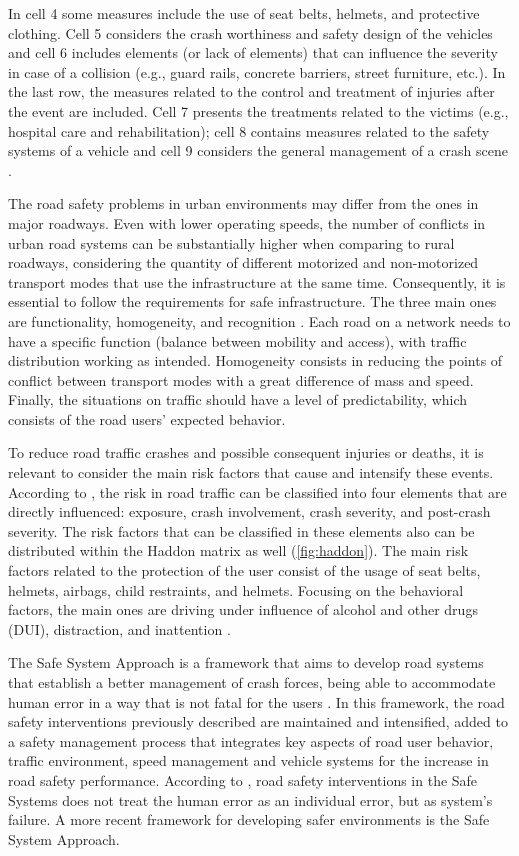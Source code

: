 In cell 4 some measures include the use of seat belts, helmets, and protective clothing. Cell 5 considers the crash worthiness and safety design of the vehicles and cell 6 includes elements (or lack of elements) that can influence the severity in case of a collision (e.g., guard rails, concrete barriers, street furniture, etc.). In the last row, the measures related to the control and treatment of injuries after the event are included. Cell 7 presents the treatments related to the victims (e.g., hospital care and rehabilitation); cell 8 contains measures related to the safety systems of a vehicle and cell 9 considers the general management of a crash scene \cite{Mohan2016}. 

The road safety problems in urban environments may differ from the ones in major roadways. Even with lower operating speeds, the number of conflicts in urban road systems can be substantially higher when comparing to rural roadways, considering the quantity of different motorized and non-motorized transport modes that use the infrastructure at the same time. Consequently, it is essential to follow the requirements for safe infrastructure. The three main ones are functionality, homogeneity, and recognition \cite{SWOV2003}. Each road on a network needs to have a specific function (balance between mobility and access), with traffic distribution working as intended. Homogeneity consists in reducing the points of conflict between transport modes with a great difference of mass and speed. Finally, the situations on traffic should have a level of predictability, which consists of the road users' expected behavior. 

To reduce road traffic crashes and possible consequent injuries or deaths, it is relevant to consider the main risk factors that cause and intensify these events. According to \textcite{WHO2004}, the risk in road traffic can be classified into four elements that are directly influenced: exposure, crash involvement, crash severity, and post-crash severity. The risk factors that can be classified in these elements also can be distributed within the Haddon matrix as well (\autoref{fig:haddon}). The main risk factors related to the protection of the user consist of the usage of seat belts, helmets, airbags, child restraints, and helmets. Focusing on the behavioral factors, the main ones are driving under influence of alcohol and other drugs (DUI), distraction, and inattention \cite{Shinar2017}.

The Safe System Approach is a framework that aims to develop road systems that establish a better management of crash forces, being able to accommodate human error in a way that is not fatal for the users \cite{international_transport_forum_towards_2008}. In this framework, the road safety interventions previously described are maintained and intensified, added to a safety management process that integrates key aspects of road user behavior, traffic environment, speed management and vehicle systems for the increase in road safety performance. According to \textcite{larssonSafeSystemApproach2013}, road safety interventions in the Safe Systems does not treat the human error as an individual error, but as system's failure. A more recent framework for developing safer environments is the Safe System Approach. 

